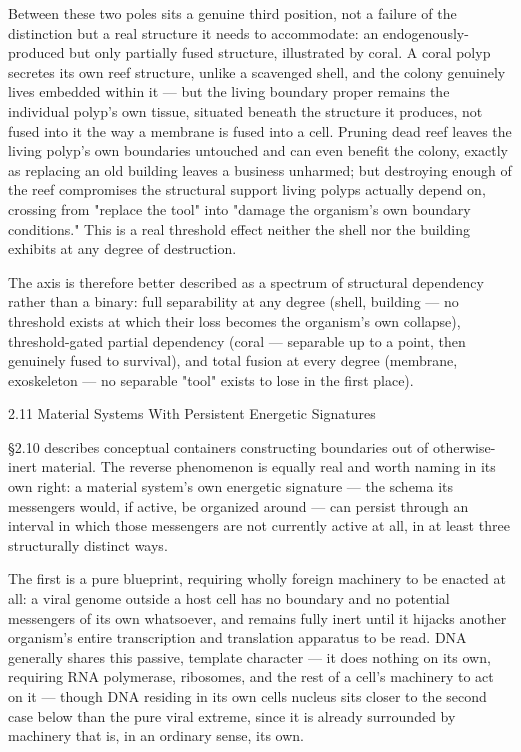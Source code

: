 \documentclass[
]{article}
\begin{document}
Between these two poles sits a genuine third position, not a failure of
the distinction but a real structure it needs to accommodate: an
endogenously-produced but only partially fused structure, illustrated by
coral. A coral polyp secretes its own reef structure, unlike a scavenged
shell, and the colony genuinely lives embedded within it --- but the
living boundary proper remains the individual polyp's own tissue,
situated beneath the structure it produces, not fused into it the way a
membrane is fused into a cell. Pruning dead reef leaves the living
polyp's own boundaries untouched and can even benefit the colony,
exactly as replacing an old building leaves a business unharmed; but
destroying enough of the reef compromises the structural support living
polyps actually depend on, crossing from "replace the tool" into "damage
the organism's own boundary conditions." This is a real threshold effect
neither the shell nor the building exhibits at any degree of
destruction.

The axis is therefore better described as a spectrum of structural
dependency rather than a binary: full separability at any degree (shell,
building --- no threshold exists at which their loss becomes the
organism's own collapse), threshold-gated partial dependency (coral ---
separable up to a point, then genuinely fused to survival), and total
fusion at every degree (membrane, exoskeleton --- no separable "tool"
exists to lose in the first place).

2.11 Material Systems With Persistent Energetic Signatures

§2.10 describes conceptual containers constructing boundaries out of
otherwise-inert material. The reverse phenomenon is equally real and
worth naming in its own right: a material system's own energetic
signature --- the schema its messengers would, if active, be organized
around --- can persist through an interval in which those messengers are
not currently active at all, in at least three structurally distinct
ways.

The first is a pure blueprint, requiring wholly foreign machinery to be
enacted at all: a viral genome outside a host cell has no boundary and
no potential messengers of its own whatsoever, and remains fully inert
until it hijacks another organism's entire transcription and translation
apparatus to be read. DNA generally shares this passive, template
character --- it does nothing on its own, requiring RNA polymerase,
ribosomes, and the rest of a cell's machinery to act on it --- though
DNA residing in its own cells nucleus sits closer to the second case
below than the pure viral extreme, since it is already surrounded by
machinery that is, in an ordinary sense, its own.
\end{document}
